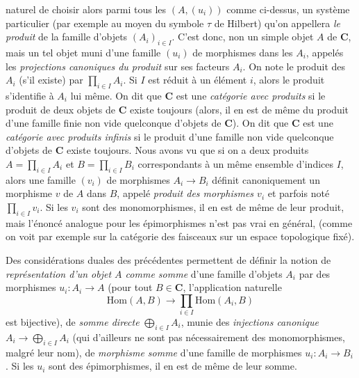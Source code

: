 
\noindent naturel de choisir alors parmi tous les $(A,(u_i))$ comme ci-dessus,
un système particulier (par exemple au moyen du symbole $\tau$ de Hilbert)
qu'on appellera \textit{le produit} de la famille d'objets $(A_i)_{i\in I}$.
C'est donc, non un simple objet $A$ de $\mathbf{C}$, mais un tel objet muni d'une
famille $(u_i)$ de morphismes dans les $A_i$, appelés les
\textit{projections canoniques du produit} sur ses facteurs $A_i$. On note le
produit des $A_i$ (s'il existe) par $\displaystyle\prod_{i\in I}A_i$. Si $I$ est réduit à
un élément $i$, alors le produit s'identifie à $A_i$ lui même. On dit que $\mathbf{C}$
est une \textit{catégorie avec produits} si le produit de deux objets de $\mathbf{C}$
existe toujours (alors, il en est de même du produit d'une famille finie non
vide quelconque d'objets de $\mathbf{C}$). On dit que $\mathbf{C}$ est une \textit{catégorie
avec produits infinis} si le produit d'une famille non vide quelconque d'objets
de $\mathbf{C}$ existe toujours. Nous avons vu que si on a deux produits
$A=\displaystyle\prod_{i\in I}A_i$ et $B=\displaystyle\prod_{i\in I}B_i$ correspondants à un même
ensemble d'indices $I$, alors une famille $(v_i)$ de morphismes
$A_i\to B_i$ définit canoniquement un morphisme $v$ de $A$ dans
$B$, appelé \textit{produit des morphismes $v_i$} et parfois noté
$\displaystyle\prod_{i\in I}v_i$. Si les $v_i$ sont des monomorphismes, il en est de même
de leur produit, mais l'énoncé analogue pour les épimorphismes n'est pas vrai
en général, (comme on voit par exemple sur la catégorie des faisceaux sur un
espace topologique fixé).

Des considérations duales des précédentes permettent de définir la notion de
\textit{représentation d'un objet $A$ comme somme} d'une famille d'objets $A_i$
par des morphismes $u_i:A_i\to A$ (pour tout $B\in \mathbf{C}$,
l'application naturelle
\[
  \mathrm{Hom}(A,B)\to
  \prod_{i\in I}\mathrm{Hom}(A_i,B)
\]
est bijective), de \textit{somme directe} $\displaystyle\bigoplus_{i\in I}A_i$, munie des
\textit{injections canonique} $A_i\to\displaystyle\bigoplus_{i\in I}A_i$ (qui
d'ailleurs ne sont pas nécessairement des monomorphismes, malgré leur nom), de
\textit{morphisme somme} d'une famille de morphismes
$u_i:A_i\to B_i$. Si les $u_i$ sont des épimorphismes, il en est de
même de leur somme.

